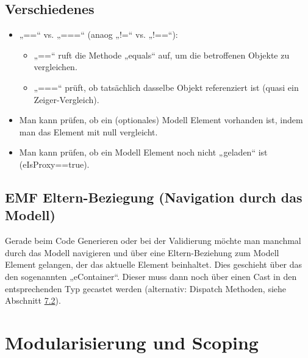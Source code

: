 \documentclass[a4]{article}
\providecommand{\tightlist}{%
  \setlength{\itemsep}{0pt}\setlength{\parskip}{0pt}}
\begin{document}
\subsection[Verschiedenes]{\texorpdfstring{\protect\hypertarget{anchor-40}{}{}Verschiedenes}{Verschiedenes}}\label{verschiedenes}

\begin{itemize}
\item
  „==`` vs. „===`` (anaog „!=`` vs. „!==``):

  \begin{itemize}
  \tightlist
  \item
    „==`` ruft die Methode „equals`` auf, um die betroffenen Objekte zu
    vergleichen.
  \item
    „===`` prüft, ob tatsächlich dasselbe Objekt referenziert ist (quasi
    ein Zeiger-Vergleich).
  \end{itemize}
\item
  Man kann prüfen, ob ein (optionales) Modell Element vorhanden ist,
  indem man das Element mit null vergleicht.
\item
  Man kann prüfen, ob ein Modell Element noch nicht „geladen`` ist
  (eIsProxy==true).
\end{itemize}

\subsection[EMF Eltern-Beziegung (Navigation durch das
Modell)]{\texorpdfstring{\protect\hypertarget{anchor-41}{}{}EMF
Eltern-Beziegung (Navigation durch das
Modell)}{EMF Eltern-Beziegung (Navigation durch das Modell)}}\label{emf-eltern-beziegung-navigation-durch-das-modell}

Gerade beim Code Generieren oder bei der Validierung möchte man manchmal
durch das Modell navigieren und über eine Eltern-Beziehung zum Modell
Element gelangen, der das aktuelle Element beinhaltet. Dies geschieht
über das den sogenannten „eContainer``. Dieser muss dann noch über einen
Cast in den entsprechenden Typ gecastet werden (alternativ: Dispatch
Methoden, siehe Abschnitt \protect\hyperlink{anchor-38}{7.2}).

\section[Modularisierung und
Scoping]{\texorpdfstring{\protect\hypertarget{anchor-42}{}{}Modularisierung
und
Scoping}{Modularisierung und Scoping}}\label{modularisierung-und-scoping}
\end{document}
